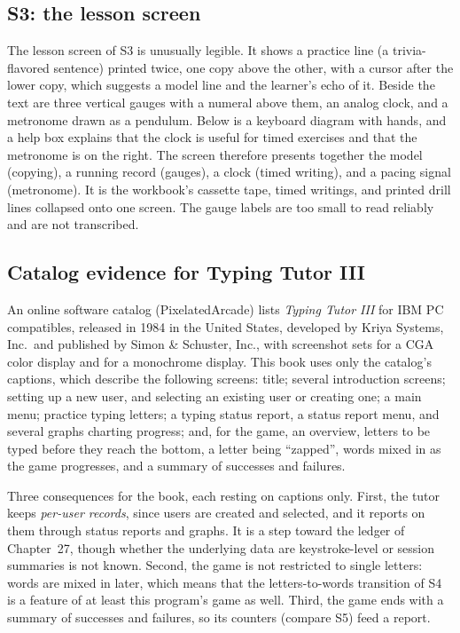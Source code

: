 \subsection{S3: the lesson screen}

The lesson screen of S3 is unusually legible. It shows a practice line (a trivia-flavored sentence) printed twice, one copy above the other, with a cursor after the lower copy, which suggests a model line and the learner's echo of it.  Beside the text are three vertical gauges with a numeral above them, an analog clock, and a metronome drawn as a pendulum. Below is a keyboard diagram with hands, and a help box explains that the clock is useful for timed exercises and that the metronome is on the right. The screen therefore presents together the model (copying), a running record (gauges), a clock (timed writing), and a pacing signal (metronome). It is the workbook's cassette tape, timed writings, and printed drill lines collapsed onto one screen. The gauge labels are too small to read reliably and are not transcribed. 

\subsection{Catalog evidence for Typing Tutor III}
\label{sec:catalog}

An online software catalog (PixelatedArcade) lists \emph{Typing Tutor III} for IBM PC compatibles, released in 1984 in the United States, developed by Kriya Systems, Inc.\ and published by Simon \& Schuster, Inc., with screenshot sets for a CGA color display and for a monochrome display. This book uses only the catalog's captions, which describe the following screens: title; several introduction screens; setting up a new user, and selecting an existing user or creating one; a main menu; practice typing letters; a typing status report, a status report menu, and several graphs charting progress; and, for the game, an overview, letters to be typed before they reach the bottom, a letter being ``zapped'', words mixed in as the game progresses, and a summary of successes and failures. 

Three consequences for the book, each resting on captions only. First, the tutor keeps \emph{per-user records}, since users are created and selected, and it reports on them through status reports and graphs. It is a step toward the ledger of Chapter~27, though whether the underlying data are keystroke-level or session summaries is not known. Second, the game is not restricted to single letters: words are mixed in later, which means that the letters-to-words transition of S4 is a feature of at least this program's game as well. Third, the game ends with a summary of successes and failures, so its counters (compare S5) feed a report.

